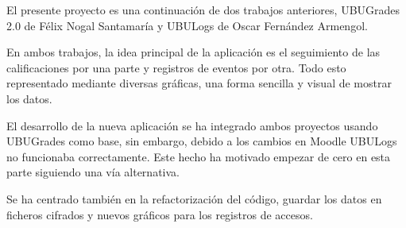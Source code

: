 


El presente proyecto es una continuación de dos trabajos anteriores, UBUGrades 2.0\cite{nogal_santamaria_continuacion_2017} de Félix Nogal Santamaría y UBULogs\cite{armengol_aplicacion_2017} de Oscar Fernández Armengol. 

En ambos trabajos, la idea principal de la aplicación es el seguimiento de las calificaciones por una parte y registros de eventos por otra. Todo esto representado mediante diversas gráficas, una forma sencilla y visual de mostrar los datos.

El desarrollo de la nueva aplicación se ha integrado ambos proyectos usando UBUGrades como base, sin embargo, debido a los cambios en Moodle UBULogs no funcionaba correctamente. Este hecho ha motivado empezar de cero en esta parte siguiendo una vía alternativa.

Se ha centrado también en la refactorización del código, guardar los datos en ficheros cifrados y nuevos gráficos para los registros de accesos.

